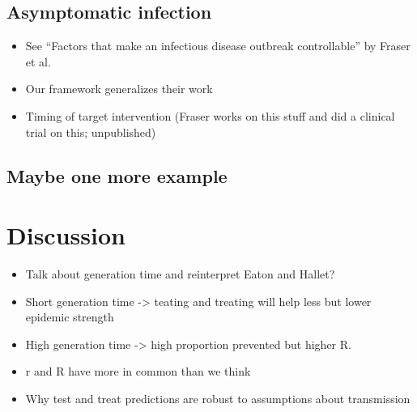 \documentclass{article}\usepackage[]{graphicx}\usepackage[]{color}
\begin{document}
\subsection{Asymptomatic infection}

\begin{itemize}
	\item See ``Factors that make an infectious disease outbreak controllable'' by Fraser et al.
	\item Our framework generalizes their work
	\item Timing of target intervention (Fraser works on this stuff and did a clinical trial on this; unpublished)
\end{itemize}

\subsection{Maybe one more example}

\section{Discussion}


\begin{itemize}
	\item Talk about generation time and reinterpret Eaton and Hallet?
	\item Short generation time -> teating and treating will help less but lower epidemic strength
	\item High generation time -> high proportion prevented but higher R.
\end{itemize}

\begin{itemize}
	\item r and R have more in common than we think
	\item Why test and treat predictions are robust to assumptions about transmission
\end{itemize}
\end{document}
